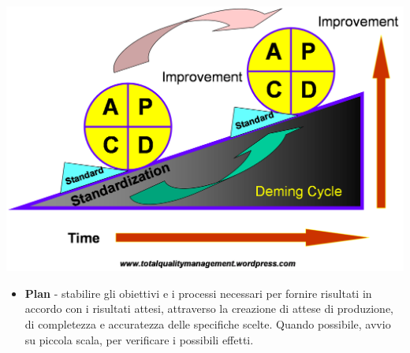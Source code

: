{  %
  \begin{center}
    \includegraphics[scale=0.3]{img/deming.png}
  \end{center}



  \begin{itemize}
  \item  \textbf{Plan} - stabilire gli obiettivi e i processi necessari per
fornire risultati in accordo con i risultati attesi, attraverso la
creazione di attese di produzione, di completezza e accuratezza delle
specifiche scelte. Quando possibile, avvio su piccola scala, per
verificare i possibili effetti.



\end{itemize}}
